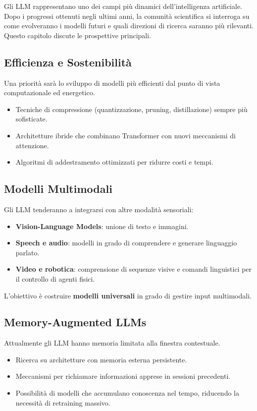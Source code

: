 Gli LLM rappresentano uno dei campi più dinamici dell'intelligenza artificiale. 
Dopo i progressi ottenuti negli ultimi anni, la comunità scientifica 
si interroga su come evolveranno i modelli futuri e quali direzioni di ricerca 
saranno più rilevanti. 
Questo capitolo discute le prospettive principali.

\subsection{Efficienza e Sostenibilità}
Una priorità sarà lo sviluppo di modelli più efficienti dal punto di vista computazionale ed energetico.
\begin{itemize}
    \item Tecniche di compressione (quantizzazione, pruning, distillazione) sempre più sofisticate.
    \item Architetture ibride che combinano Transformer con nuovi meccanismi di attenzione.
    \item Algoritmi di addestramento ottimizzati per ridurre costi e tempi.
\end{itemize}

\subsection{Modelli Multimodali}
Gli LLM tenderanno a integrarsi con altre modalità sensoriali:
\begin{itemize}
    \item \textbf{Vision-Language Models}: unione di testo e immagini.
    \item \textbf{Speech e audio}: modelli in grado di comprendere e generare linguaggio parlato.
    \item \textbf{Video e robotica}: comprensione di sequenze visive e comandi linguistici per il controllo di agenti fisici.
\end{itemize}
L'obiettivo è costruire \textbf{modelli universali} in grado di gestire input multimodali.

\subsection{Memory-Augmented LLMs}
Attualmente gli LLM hanno memoria limitata alla finestra contestuale.
\begin{itemize}
    \item Ricerca su architetture con memoria esterna persistente.
    \item Meccanismi per richiamare informazioni apprese in sessioni precedenti.
    \item Possibilità di modelli che accumulano conoscenza nel tempo, riducendo la necessità di retraining massivo.
\end{itemize}

